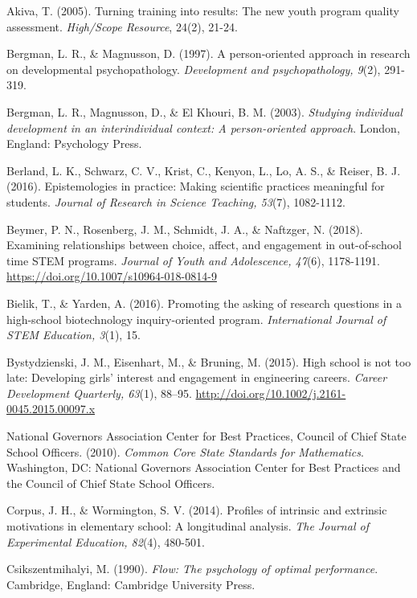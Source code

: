 \documentclass[]{msu-thesis}
\theoremstyle{definition}
\theoremstyle{definition}
\theoremstyle{definition}
\theoremstyle{remark}
\begin{document}
\setlength{\parindent}{-0.2in} \setlength{\leftskip}{0.2in}
\setlength{\parskip}{8pt} \noindent

Akiva, T. (2005). Turning training into results: The new youth program
quality assessment. \emph{High/Scope Resource}, 24(2), 21-24.

Bergman, L. R., \& Magnusson, D. (1997). A person-oriented approach in
research on developmental psychopathology. \emph{Development and
psychopathology, 9}(2), 291-319.

Bergman, L. R., Magnusson, D., \& El Khouri, B. M. (2003).
\emph{Studying individual development in an interindividual context: A
person-oriented approach}. London, England: Psychology Press.

Berland, L. K., Schwarz, C. V., Krist, C., Kenyon, L., Lo, A. S., \&
Reiser, B. J. (2016). Epistemologies in practice: Making scientific
practices meaningful for students. \emph{Journal of Research in Science
Teaching, 53}(7), 1082-1112.

Beymer, P. N., Rosenberg, J. M., Schmidt, J. A., \& Naftzger, N. (2018).
Examining relationships between choice, affect, and engagement in
out-of-school time STEM programs. \emph{Journal of Youth and
Adolescence, 47}(6), 1178-1191.
\url{https://doi.org/10.1007/s10964-018-0814-9}

Bielik, T., \& Yarden, A. (2016). Promoting the asking of research
questions in a high-school biotechnology inquiry-oriented program.
\emph{International Journal of STEM Education, 3}(1), 15.

Bystydzienski, J. M., Eisenhart, M., \& Bruning, M. (2015). High school
is not too late: Developing girls' interest and engagement in
engineering careers. \emph{Career Development Quarterly, 63}(1), 88--95.
\url{http://doi.org/10.1002/j.2161-0045.2015.00097.x}

National Governors Association Center for Best Practices, Council of
Chief State School Officers. (2010). \emph{Common Core State Standards
for Mathematics}. Washington, DC: National Governors Association Center
for Best Practices and the Council of Chief State School Officers.

Corpus, J. H., \& Wormington, S. V. (2014). Profiles of intrinsic and
extrinsic motivations in elementary school: A longitudinal analysis.
\emph{The Journal of Experimental Education, 82}(4), 480-501.

Csikszentmihalyi, M. (1990). \emph{Flow: The psychology of optimal
performance}. Cambridge, England: Cambridge University Press.
\end{document}
